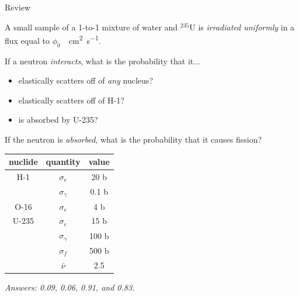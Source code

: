\documentclass[aspectratio=1610]{beamer}
\let\oldfootnotesize\footnotesize
\renewcommand*{\footnotesize}{\oldfootnotesize\tiny}
\begin{document}
\begin{frame}{Review}

\begin{minipage}{0.55\linewidth}

A small sample of a 1-to-1 mixture of water and ${}^{235}$U is {\it irradiated
uniformly} in a flux equal to $\phi_0$~\si{\per\centi\meter\squared\per\second}. 

\vspace{0.5cm}

If a neutron \emph{interacts}, what is the probability that it...
\begin{itemize}
 \item elastically scatters off of \emph{any} nucleus? 
 \item elastically scatters off of H-1?
 \item is absorbed by U-235?
\end{itemize}
 
\vspace{0.5cm}


If the neutron is \emph{absorbed}, what is the probability that it
causes fission?



\end{minipage}
\hfill
\begin{minipage}{0.35\linewidth}
\begin{table}[t]
\begin{tabular}{ccc}
\toprule
nuclide & quantity & value \\
\midrule
H-1    & \(\sigma_e\) & 20 b \\
       & \(\sigma_{\gamma}\) & 0.1 b \\
O-16   & \(\sigma_e\) & 4 b \\
U-235  & \(\sigma_e\) & 15 b \\
       & \(\sigma_{\gamma}\) & 100 b\\
       & \(\sigma_{f}\) & 500 b \\
       & \(\bar{\nu}\) & 2.5 \\
\bottomrule
\end{tabular}
\end{table}

\end{minipage}


\pause
\vspace{0.5cm}

{\footnotesize {\it Answers: 0.09, 0.06, 0.91, and 0.83.}}

\end{frame}
\end{document}
